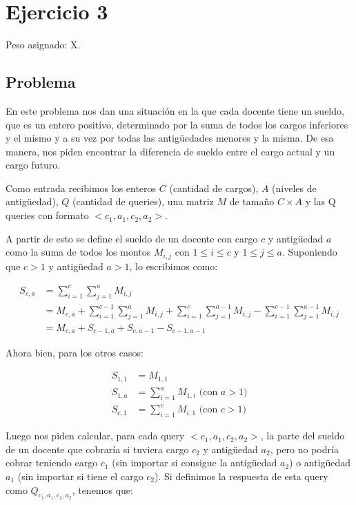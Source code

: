 \section{Ejercicio 3}

Peso asignado: X.

\subsection{Problema}

En este problema nos dan una situación en la que cada docente tiene un sueldo, que es un entero positivo, determinado por la suma de
todos los cargos inferiores y el mismo y a su vez por todas las antigüedades menores y la misma. De esa manera, nos piden encontrar
la diferencia de sueldo entre el cargo actual y un cargo futuro.

Como entrada recibimos los enteros $C$ (cantidad de cargos), $A$ (niveles de antigüedad), $Q$ (cantidad de queries), una matriz $M$
de tamaño $C \times A$ y las Q queries con formato $<c_1, a_1, c_2, a_2>$.

A partir de esto se define el sueldo de un docente con cargo $c$ y antigüedad $a$ como la suma de
todos los montos $M_{i,j}$ con $1 \leq i \leq c$ y $1 \leq j \leq a$. Suponiendo que $c > 1$ y
antigüedad $a > 1$, lo escribimos como:

\begin{equation*}
\begin{split}
    S_{c,a} & = \sum_{i=1}^{c}{\sum_{j=1}^{a}{M_{i,j}}} \\
    		& = M_{c,a} + \sum_{i=1}^{c-1}{\sum_{j=1}^{a}{M_{i,j}}} + 
    		\sum_{i=1}^{c}{\sum_{j=1}^{a-1}{M_{i,j}}} - 
    		\sum_{i=1}^{c-1}{\sum_{j=1}^{a-1}{M_{i,j}}} \\
    		& = M_{c,a} + S_{c-1,a} + S_{c,a-1} - S_{c-1,a-1}
\end{split}
\end{equation*}

Ahora bien, para los otros casos:

\begin{equation*}
\begin{split}
    S_{1,1} & = M_{1,1} \\
    S_{1,a} & = \sum_{i=1}^{a}{M_{1,i}} \text{   (con $a > 1$)} \\
    S_{c,1} & = \sum_{i=1}^{c}{M_{i,1}} \text{   (con $c > 1$)}
\end{split}
\end{equation*}

Luego nos piden calcular, para cada query $<c_1, a_1, c_2, a_2>$, la parte del sueldo de un docente que
cobraría si tuviera cargo $c_2$ y antigüedad $a_2$, pero no podría cobrar teniendo cargo $c_1$ (sin importar
si consigue la antigüedad $a_2$) o antigüedad $a_1$ (sin importar si tiene el cargo $c_2$). Si definimos la
respuesta de esta query como $Q_{c_1,a_1,c_2,a_2}$, tenemos que: 

